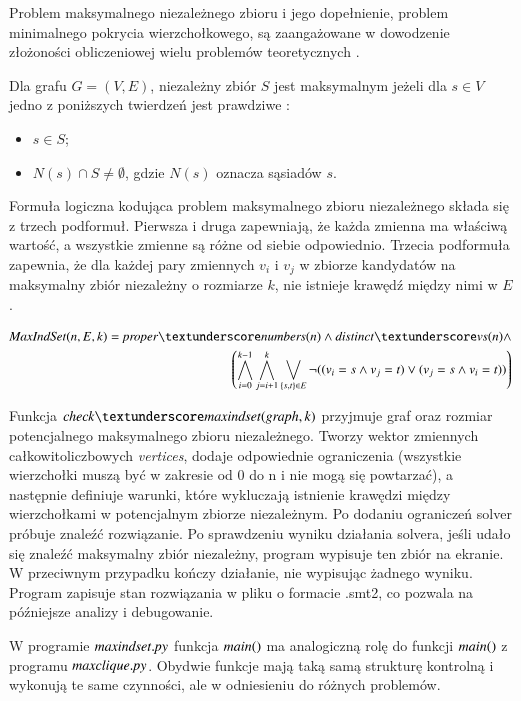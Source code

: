 Problem maksymalnego niezależnego zbioru i jego dopełnienie, problem minimalnego pokrycia wierzchołkowego, są zaangażowane w dowodzenie złożoności obliczeniowej wielu problemów teoretycznych \cite{Skiena20}.

Dla grafu $G = (V, E)$, niezależny zbiór \(S\) jest maksymalnym jeżeli dla $s \in V$ jedno z poniższych twierdzeń jest prawdziwe \cite{maxIndSetDef}:

\begin{itemize}
	\item $s \in S$;
	\item $N(s) \cap S \neq \emptyset$, gdzie \(N(s)\) oznacza sąsiadów \(s\).
\end{itemize}

Formuła logiczna kodująca problem maksymalnego zbioru niezależnego składa się z trzech podformuł. Pierwsza i druga zapewniają, że każda zmienna ma właściwą wartość, a wszystkie zmienne są różne od siebie odpowiednio. Trzecia podformuła zapewnia, że dla każdej pary zmiennych \(v_i\) i \(v_j\) w zbiorze kandydatów na maksymalny zbiór niezależny o rozmiarze \(k\), nie istnieje krawędź między nimi w \(E\).

\begin{align*}
	\MaxIndSet(n, E, k) = \propernumbers \land \distinctvs  \land \\
	\left( \bigwedge_{i=0}^{k-1} \bigwedge_{j=i+1}^{k} \bigvee_{\{s,t\} \in E} \lnot((v_i = s \land v_j = t) \lor (v_j = s \land v_i = t)) \right)	
\end{align*}

Funkcja $\checkmaxindset$ przyjmuje graf oraz rozmiar potencjalnego maksymalnego zbioru niezależnego. Tworzy wektor zmiennych całkowitoliczbowych \textit{vertices}, dodaje odpowiednie ograniczenia (wszystkie wierzchołki muszą być w zakresie od 0 do n i nie mogą się powtarzać), a następnie definiuje warunki, które wykluczają istnienie krawędzi między wierzchołkami w potencjalnym zbiorze niezależnym. Po dodaniu ograniczeń solver próbuje znaleźć rozwiązanie. Po sprawdzeniu wyniku działania solvera, jeśli udało się znaleźć maksymalny zbiór niezależny, program wypisuje ten zbiór na ekranie. W przeciwnym przypadku kończy działanie, nie wypisując żadnego wyniku. Program zapisuje stan rozwiązania w pliku o formacie .smt2, co pozwala na późniejsze analizy i debugowanie.



W programie ${\mathit{maxindset.py}}$ funkcja ${\mathit{main()}}$ ma analogiczną rolę do funkcji ${\mathit{main()}}$ z programu ${\mathit{maxclique.py}}$. Obydwie funkcje mają taką samą strukturę kontrolną i wykonują te same czynności, ale w odniesieniu do różnych problemów. 

